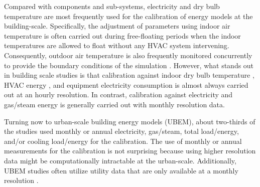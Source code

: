 \documentclass[review]{elsarticle}
\begin{document}
Compared with components and sub-systems, electricity and dry bulb temperature are most frequently used for the calibration of energy models at the building-scale. Specifically, the adjustment of parameters using indoor air temperature is often carried out during free-floating periods when the indoor temperatures are allowed to float without any HVAC system intervening. Consequently, outdoor air temperature is also frequently monitored concurrently to provide the boundary conditions of the simulation \cite{martinez2019energy, figueiredo2018comparison, lee2018improvements, andrade-cabrera2017ensemble, mylona2017frozen, elharidi2017energy, tokarik2016life, ramosruiz2016genetic, roberti2015calibrating, cipriano2015evaluation, derosa2019iterative, zuhaib2019application, lundstrom2019bayesian, aparicio-fernandez2019energy, cornaro2017energy, ferrara2020optimizing}. However, what stands out in building scale studies is that calibration against indoor dry bulb temperature \cite{figueiredo2018comparison, lee2018improvements, andrade-cabrera2017ensemble, ogando2017energy, mylona2017frozen, elharidi2017energy, mihai2017bottom, ramosruiz2017analysis, enriquez2017towards, tokarik2016life, carlon2016on, roberti2015calibrating, royapoor2015building, cipriano2015evaluation, zuhaib2019application, lundstrom2019bayesian, martinez2020performance, sakiyama2020natural, giuliani2016modeling, ferrara2020optimizing, odonovan2019predicting, rouchier2019sequential}, HVAC energy \cite{glasgo2017assessing, yin2016linking, ji2015bottom, yang2015model, Ha2020parameter, carlon2015experimental}, and equipment electricity consumption \cite{abdelalim2017data, elharidi2017energy, kim2017building, yin2016linking} is almost always carried out at an hourly resolution. In contrast, calibration against electricity and gas/steam energy is generally carried out with monthly resolution data. 

Turning now to urban-scale building energy models (UBEM), about two-thirds of the studies used monthly or annual electricity, gas/steam, total load/energy, and/or cooling load/energy for the calibration. The use of monthly or annual measurements for the calibration is not surprising because using higher resolution data might be computationally intractable at the urban-scale. Additionally, UBEM studies often utilize utility data that are only available at a monthly resolution \cite{sokol2017validation, nagpal2019framework, krayem2019urban}. 
\end{document}
